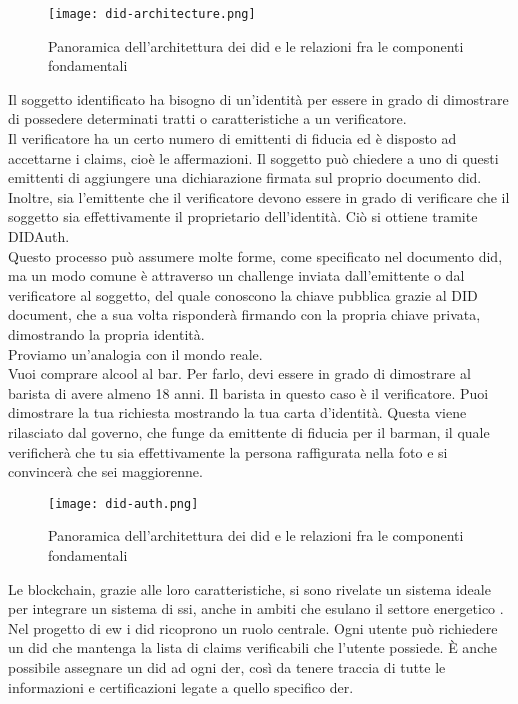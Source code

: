 \begin{figure}[h]
    \texttt{[image: did-architecture.png]}
    \centering
    \caption{Panoramica dell'architettura dei \gls{did} e le relazioni fra le componenti fondamentali \cite{img:did-architecture}}
    \label{lab:did-architecture}
\end{figure}

Il soggetto identificato ha bisogno di un’identità per essere in grado di dimostrare di possedere determinati tratti o caratteristiche a un verificatore. \\
Il verificatore ha un certo numero di emittenti di fiducia ed è disposto ad accettarne i claims, cioè le affermazioni.
Il soggetto può chiedere a uno di questi emittenti di aggiungere una dichiarazione firmata sul proprio documento \gls{did}. 
Inoltre, sia l'emittente che il verificatore devono essere in grado di verificare che il soggetto sia effettivamente il proprietario dell'identità. 
Ciò si ottiene tramite DIDAuth. \\
Questo processo può assumere molte forme, come specificato nel documento \gls{did}, ma un modo comune è attraverso un challenge inviata dall'emittente o dal verificatore al soggetto, 
del quale conoscono la chiave pubblica grazie al DID document, che a sua volta risponderà firmando con la propria chiave privata, dimostrando la propria identità. \\

Proviamo un'analogia con il mondo reale. \\
Vuoi comprare alcool al bar. Per farlo, devi essere in grado di dimostrare al barista di avere almeno 18 anni. Il barista in questo caso è il verificatore.
Puoi dimostrare la tua richiesta mostrando la tua carta d'identità.
Questa viene rilasciato dal governo, che funge da emittente di fiducia per il barman, 
il quale verificherà che tu sia effettivamente la persona raffigurata nella foto e si convincerà che sei maggiorenne.

\begin{figure}[h]
    \texttt{[image: did-auth.png]}
    \centering
    \caption{Panoramica dell'architettura dei \gls{did} e le relazioni fra le componenti fondamentali \cite{img:did-auth}}
    \label{lab:did-auth}
\end{figure}

Le blockchain, grazie alle loro caratteristiche, si sono rivelate un sistema ideale per integrare un sistema di \gls{ssi}, anche in ambiti che esulano il settore energetico \cite{art:blockchain-did}. \\
Nel progetto di \gls{ew} i \gls{did} ricoprono un ruolo centrale. 
Ogni utente può richiedere un \gls{did} che mantenga la lista di claims verificabili che l'utente possiede.
È anche possibile assegnare un \gls{did} ad ogni \gls{der}, così da tenere traccia di tutte le informazioni e certificazioni legate a quello specifico \gls{der}. \\

